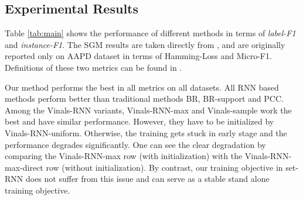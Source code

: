 

\subsection{Experimental Results}

Table \ref{tab:main} shows the performance of different methods in terms of \emph{label-F1} and \emph{instance-F1}. The SGM results are taken directly from \cite{DBLP:journals/corr/abs-1806-04822}, and are originally reported only on AAPD dataset in terms of Hamming-Loss and Micro-F1. Definitions of these two metrics can be found in \cite{koyejo2015consistent}.  

 
Our method performs the best in all metrics on all datasets. All RNN based methods perform better than traditional methods BR, BR-support and PCC. Among the Vinals-RNN variants, Vinals-RNN-max and Vinals-sample work the best and have similar performance. However, they have to be initialized by Vinals-RNN-uniform. Otherwise, the training gets stuck in early stage and the performance degrades significantly. One can see the clear degradation by comparing the Vinals-RNN-max row (with initialization) with the Vinals-RNN-max-direct row (without initialization). By contrast, our training objective in set-RNN does not suffer from this issue and can serve as a stable stand alone training objective.

